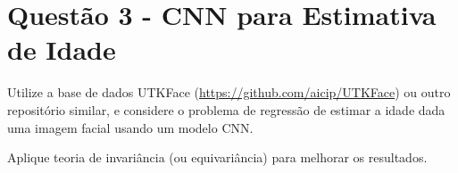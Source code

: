 \documentclass[10pt,a4paper]{article}
\begin{document}
\section{Questão 3 - CNN para Estimativa de Idade}

Utilize a base de dados UTKFace (\url{https://github.com/aicip/UTKFace}) ou outro repositório similar, e considere o problema de regressão de estimar a idade dada uma imagem facial usando um modelo CNN.

Aplique teoria de invariância (ou equivariância) para melhorar os resultados.



\end{document}
